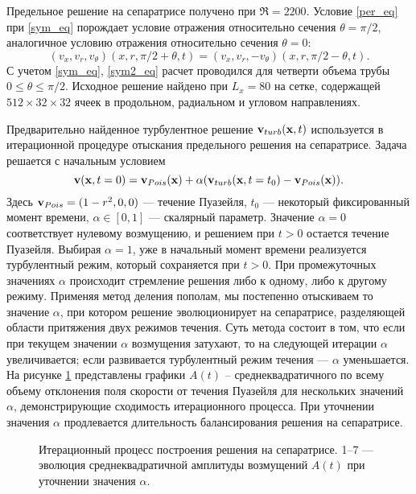 Предельное решение на сепаратрисе получено при $\Re=2200$. Условие \eqref{per_eq} при \eqref{sym_eq} порождает условие отражения относительно сечения $\theta = \pi/2$, аналогичное условию отражения относительно сечения $\theta = 0$:
\begin{equation} \label{sym2_eq}
(v_x, v_r, v_\theta)(x, r, \pi/2 + \theta, t) = (v_x, v_r, -v_\theta)(x, r, \pi / 2 - \theta, t).
\end{equation}
С учетом \eqref{sym_eq}, \eqref{sym2_eq} расчет проводился для четверти объема трубы $0\leqslant\theta\leqslant\pi/2$. Исходное решение найдено при $L_x = 80$ на сетке, содержащей $512 \times 32 \times  32$ ячеек в продольном, радиальном и угловом направлениях. 

Предварительно найденное турбулентное решение $\mathbf{v}_{turb}(\mathbf{x},t)$ используется в итерационной процедуре отыскания предельного решения на сепаратрисе. Задача решается с начальным условием
\begin{equation} \label{edge_init_eq}
\mathbf{v}(\mathbf{x},t=0) = \mathbf{v}_{Pois}(\mathbf{x})+\alpha(\mathbf{v}_{turb}(\mathbf{x},t=t_0) - \mathbf{v}_{Pois}(\mathbf{x})).
\end{equation}
Здесь $\mathbf{v}_{Pois}=(1-r^2,0,0)$ --- течение Пуазейля, $t_0$ --- некоторый фиксированный момент времени, $\alpha \in [0,1]$ --- скалярный параметр. Значение $\alpha=0$ соответствует нулевому возмущению, и решением при $t > 0$ остается течение Пуазейля. Выбирая $\alpha=1$, уже в начальный момент времени реализуется турбулентный режим, который сохраняется при $t > 0$. При промежуточных значениях $\alpha$ происходит стремление решения либо к одному, либо к другому режиму. Применяя метод деления пополам, мы постепенно отыскиваем то значение $\alpha$, при котором решение эволюционирует на сепаратрисе, разделяющей области притяжения двух режимов течения. Суть метода состоит в том, что если при текущем значении $\alpha$ возмущения затухают, то на следующей итерации $\alpha$ увеличивается; если развивается турбулентный режим течения --- $\alpha$ уменьшается. На рисунке \ref{bisection_pic} представлены графики $A(t)$ – среднеквадратичного по всему объему отклонения поля скорости от течения Пуазейля для нескольких значений $\alpha$, демонстрирующие сходимость итерационного процесса. При уточнении значения $\alpha$ продлевается длительность балансирования решения на сепаратрисе.


\begin{figure}
\caption{Итерационный процесс построения решения на сепаратрисе. 1--7 --- эволюция среднеквадратичной амплитуды возмущений $A(t)$ при уточнении значения $\alpha$.}
\label{bisection_pic}
\end{figure}


